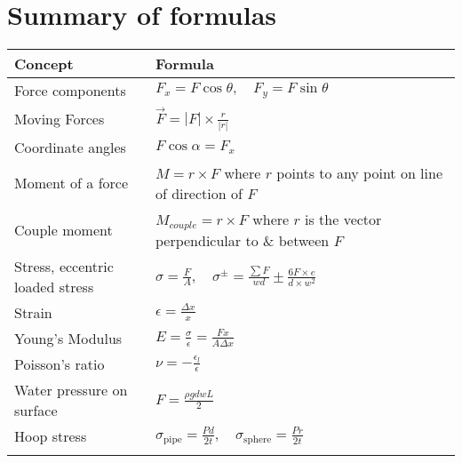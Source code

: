 
\section{Summary of formulas}
\small
\begin{tabular}{|l|l|}
    \hline
    \textbf{Concept}                 & \textbf{Formula}                                                                            \\\hline
    Force components                 & $F_x=F\cos\theta,\quad F_y=F\sin\theta$                                                     \\
    Moving Forces                    & $\vec{F}=|F|\times\frac{r}{|r|}$                                                            \\
    Coordinate angles                & $F\cos\alpha = F_x$                                                                         \\
    Moment of a force                & $M=r\times F$ where $r$ points to any point on line of direction of $F$                     \\
    Couple moment                   & $M_{couple}=r\times F$ where $r$ is the vector perpendicular to \& between $F$                                                                      \\
    Stress, eccentric loaded stress                           & $\sigma=\frac{F}{A},\quad\sigma^{\pm}=\frac{\sum F}{wd}\pm \frac{6F\times e}{d\times w^2}$                                                                        \\
    Strain                           & $\epsilon=\frac{\Delta x}{x}$                                                               \\
    Young's Modulus                  & $E=\frac{\sigma}{\epsilon}=\frac{Fx}{A\Delta x}$                                            \\
    Poisson's ratio                  & $\nu=-\frac{\epsilon_l}{\epsilon}$                                                          \\
    Water pressure on surface        & $F = \frac{\rho gdwL}{2}$                                                                   \\
    Hoop stress                      & $\sigma_{\text{pipe}}=\frac{Pd}{2t},\quad\sigma_{\text{sphere}}=\frac{Pr}{2t}$              \\
                                     &                                                                                             \\

\end{tabular}
